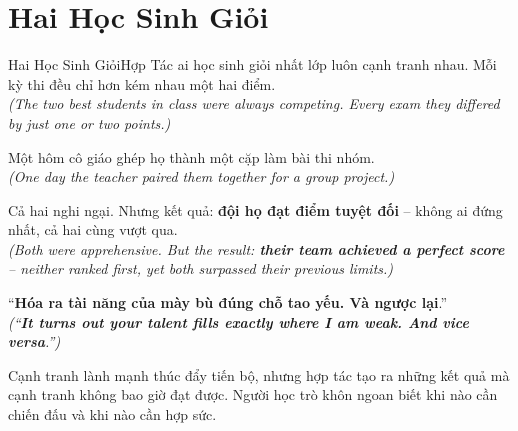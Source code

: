 \section{Hai Học Sinh Giỏi}
\begin{truyen}{Hai Học Sinh Giỏi}{Hợp Tác}
ai học sinh giỏi nhất lớp luôn cạnh tranh nhau. Mỗi kỳ thi đều chỉ hơn kém nhau một hai điểm.\\
\textit{(The two best students in class were always competing. Every exam they differed by just one or two points.)}

Một hôm cô giáo ghép họ thành một cặp làm bài thi nhóm.\\
\textit{(One day the teacher paired them together for a group project.)}

Cả hai nghi ngại. Nhưng kết quả: \textbf{đội họ đạt điểm tuyệt đối} – không ai đứng nhất, cả hai cùng vượt qua.\\
\textit{(Both were apprehensive. But the result: \textbf{their team achieved a perfect score} – neither ranked first, yet both surpassed their previous limits.)}

``\textbf{Hóa ra tài năng của mày bù đúng chỗ tao yếu. Và ngược lại}.''\\
\textit{(``\textbf{It turns out your talent fills exactly where I am weak. And vice versa}.'')}
\end{truyen}
\begin{baihoc}
  Cạnh tranh lành mạnh thúc đẩy tiến bộ, nhưng hợp tác tạo ra những kết quả mà cạnh tranh không bao giờ đạt được. Người học trò khôn ngoan biết khi nào cần chiến đấu và khi nào cần hợp sức.
\end{baihoc}

